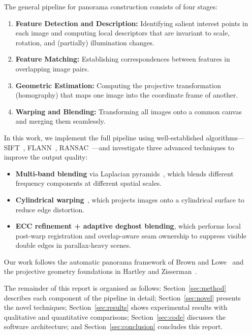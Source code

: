 \documentclass[conference]{IEEEtran}
\begin{document}
The general pipeline for panorama construction consists of four stages:
\begin{enumerate}
  \item \textbf{Feature Detection and Description:} Identifying salient
        interest points in each image and computing local descriptors that are
        invariant to scale, rotation, and (partially) illumination changes.
  \item \textbf{Feature Matching:} Establishing correspondences between
        features in overlapping image pairs.
  \item \textbf{Geometric Estimation:} Computing the projective transformation
        (homography) that maps one image into the coordinate frame of another.
  \item \textbf{Warping and Blending:} Transforming all images onto a common
        canvas and merging them seamlessly.
\end{enumerate}

In this work, we implement the full pipeline using well-established
algorithms—SIFT~\cite{lowe2004}, FLANN~\cite{muja2009},
RANSAC~\cite{fischler1981}—and investigate three advanced techniques to
improve the output quality:
\begin{itemize}
  \item \textbf{Multi-band blending} via Laplacian pyramids~\cite{burt1983},
        which blends different frequency components at different spatial scales.
  \item \textbf{Cylindrical warping}~\cite{szeliski2006}, which projects
        images onto a cylindrical surface to reduce edge distortion.
  \item \textbf{ECC refinement + adaptive deghost blending}, which performs
        local post-warp registration and overlap-aware seam ownership to
        suppress visible double edges in parallax-heavy scenes.
\end{itemize}

Our work follows the automatic panorama framework of Brown and
Lowe~\cite{brown2007} and the projective geometry foundations in Hartley and
Zisserman~\cite{hartley2003}.

The remainder of this report is organised as follows: Section~\ref{sec:method}
describes each component of the pipeline in detail; Section~\ref{sec:novel}
presents the novel techniques; Section~\ref{sec:results} shows experimental
results with qualitative and quantitative comparisons; Section~\ref{sec:code}
discusses the software architecture; and Section~\ref{sec:conclusion}
concludes this report.
\end{document}
